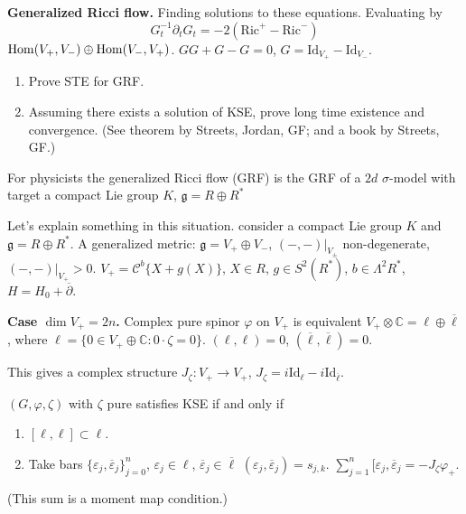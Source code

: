 {\medskip\noindent
{\bf Generalized Ricci flow.}
Finding solutions to these equations.
Evaluating by
$$
G_t^{-1}\partial_tG_t=-2(\text{Ric}^+-\text{Ric}^-)
$$
$\mathop{\mathrm{Hom}}\nolimits(V_+,V_-) \oplus \mathop{\mathrm{Hom}}\nolimits(V_-,V_+)$.
$G G+G - G=0$, $G=\text{Id}_{V_+}-\text{Id}_{V_-}$.

\begin{exercise}
\label{exercise-}
\begin{enumerate}
\item Prove STE for GRF.
\item Assuming there exists a solution of KSE, prove long
time existence and convergence. (See theorem by Streets, Jordan, GF;
and a book by Streets, GF.)
\end{enumerate}
\end{exercise}

\begin{remark}
\label{remark-sigma-model}
For physicists the generalized Ricci flow (GRF) is the GRF of a $2d$
$\sigma$-model with target a compact Lie group 
$K$,  $\mathfrak{g}=R \oplus R^*$
\end{remark}

Let's explain something in this situation.
consider a compact Lie group $K$ and $\mathfrak{g}=R \oplus R^*$.
A generalized metric: $\mathfrak{g}=V_+ \oplus V_-$,
$(-,-)|_{V_\pm}$ non-degenerate,
$(-,-)|_{V_+}>0$.
$V_+=\mathcal{C}^b\{X+g(X)\}$,
$X \in R$, $g \in S^2(R^*)$, $b \in \Lambda^{2}R^*$,
$H=H_0+\overline{\partial}$.

\medskip\noindent
{\bf Case $\dim V_+=2n$.}
Complex pure spinor $\varphi$ on $V_+$ is
equivalent $V_+ \otimes \mathbb{C}=\ell \oplus \overline{\ell}$,
where $\ell=\{0 \in V_+ \oplus \mathbb{C}:0 \cdot\zeta=0\}$.
$(\ell,\ell)=0$, $(\overline{\ell},\overline{\ell})=0$.

This gives a complex structure
$J_\zeta:V_+ \to V_+$, $J_\zeta=i \text{Id}_\ell-i \text{Id}_{\overline{\ell}}$.

\begin{lemma}
\label{lemma-solutions-KSE}
$(G,\varphi,\zeta)$ with $\zeta$ pure satisfies KSE if and only if
\begin{enumerate}
\item $[\ell,\ell]\subset \ell$.
\item Take bars $\{\varepsilon_j,\overline{\varepsilon}_j\}^n_{j=0}$,
$\varepsilon_j \in \ell$, $\overline{\varepsilon}_j\in \overline{\ell}$
$(\varepsilon_j,\overline{\varepsilon}_j) = s_{j,k}$.
$\sum_{j=1}^n[\varepsilon_j,\overline{\varepsilon}_j=-J_\zeta \varphi_+$.
\end{enumerate}
\end{lemma}
(This sum is a moment map condition.)

}

